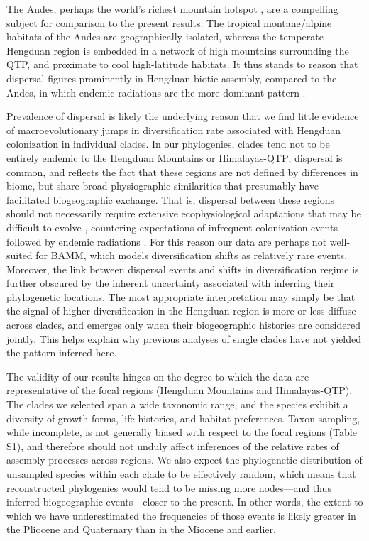 The Andes, perhaps the world's richest mountain hotspot
\citep{hughes2016}, are a compelling subject for comparison to the
present results. The tropical montane/alpine habitats of the Andes are
geographically isolated, whereas the temperate Hengduan region is
embedded in a network of high mountains surrounding the QTP, and
proximate to cool high-latitude habitats. It thus stands to reason
that dispersal figures prominently in Hengduan biotic assembly,
compared to the Andes, in which endemic radiations are the more
dominant pattern
\citep[e.g.,][]{pennington2010,Lagomarsino2016,Hughes2015,Luebert2014,Hughes2006}.

Prevalence of dispersal is likely the underlying reason that we find
little evidence of macroevolutionary jumps in diversification rate
associated with Hengduan colonization in individual clades. In our
phylogenies, clades tend not to be entirely endemic to the Hengduan
Mountains or Himalayas-QTP; dispersal is common, and reflects the fact
that these regions are not defined by differences in biome, but share
broad physiographic similarities that presumably have facilitated
biogeographic exchange. That is, dispersal between these regions
should not necessarily require extensive ecophysiological adaptations
that may be difficult to evolve \citep{Donoghue2014}, countering
expectations of infrequent colonization events followed by endemic
radiations \citep[cf.][]{Hughes2006}. For this reason our data are
perhaps not well-suited for BAMM, which models diversification shifts
as relatively rare events. Moreover, the link between dispersal events
and shifts in diversification regime is further obscured by the
inherent uncertainty associated with inferring their phylogenetic
locations. The most appropriate interpretation may simply be that the
signal of higher diversification in the Hengduan region is more or
less diffuse across clades, and emerges only when their biogeographic
histories are considered jointly. This helps explain why previous
analyses of single clades have not yielded the pattern inferred here.

The validity of our results hinges on the degree to which the data are
representative of the focal regions (Hengduan Mountains and
Himalayas-QTP). The clades we selected span a wide taxonomic range,
and the species exhibit a diversity of growth forms, life histories,
and habitat preferences. Taxon sampling, while incomplete, is not
generally biased with respect to the focal regions (Table S1), and
therefore should not unduly affect inferences of the relative rates of
assembly processes across regions. We also expect the phylogenetic
distribution of unsampled species within each clade to be effectively
random, which means that reconstructed phylogenies would tend to be
missing more nodes---and thus inferred biogeographic events---closer
to the present. In other words, the extent to which we have
underestimated the frequencies of those events is likely greater in
the Pliocene and Quaternary than in the Miocene and earlier.

